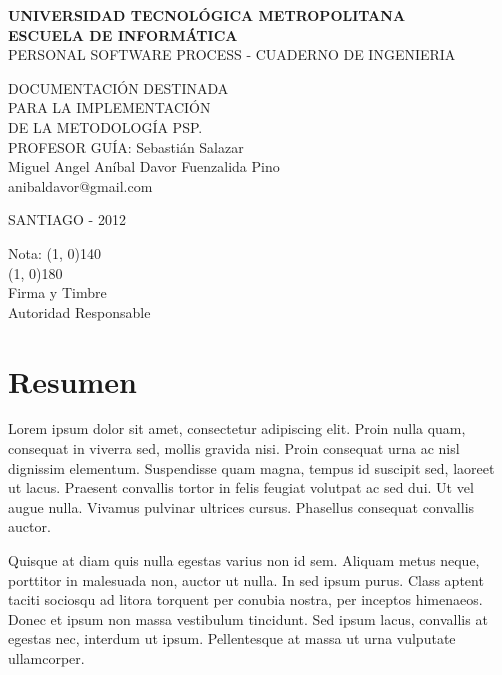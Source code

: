 \documentclass[a4paper,12pt,openany,oneside]{book}
\begin{document}
\thispagestyle{empty}
\begin{center}
\textbf{UNIVERSIDAD TECNOLÓGICA METROPOLITANA\\
ESCUELA DE INFORMÁTICA}\\
\vspace{3cm}
PERSONAL SOFTWARE PROCESS - CUADERNO DE INGENIERIA
\end{center}
\begin{flushright}
DOCUMENTACIÓN DESTINADA\\
PARA LA IMPLEMENTACIÓN\\
DE LA METODOLOGÍA PSP.\\
\vspace{3cm}
PROFESOR GUÍA: Sebastián Salazar\\
\vspace{1.5cm}
Miguel Angel Aníbal Davor Fuenzalida Pino\\
anibaldavor@gmail.com
\end{flushright}
\vspace{4cm}
\begin{center}
SANTIAGO - 2012
\end{center}
\newpage
\thispagestyle{empty}
\begin{flushright}
\vspace{20mm}
Nota: \line(1, 0){140} \\
\vspace{30 mm}
\line(1, 0){180}\\	
Firma y Timbre\\
Autoridad Responsable
\end{flushright}
\chapter*{Resumen}
\thispagestyle{empty}
Lorem ipsum dolor sit amet, consectetur adipiscing elit. Proin nulla quam, consequat in viverra sed, mollis gravida nisi. Proin consequat urna ac nisl dignissim elementum. Suspendisse quam magna, tempus id suscipit sed, laoreet ut lacus. Praesent convallis tortor in felis feugiat volutpat ac sed dui. Ut vel augue nulla. Vivamus pulvinar ultrices cursus. Phasellus consequat convallis auctor.

Quisque at diam quis nulla egestas varius non id sem. Aliquam metus neque, porttitor in malesuada non, auctor ut nulla. In sed ipsum purus. Class aptent taciti sociosqu ad litora torquent per conubia nostra, per inceptos himenaeos. Donec et ipsum non massa vestibulum tincidunt. Sed ipsum lacus, convallis at egestas nec, interdum ut ipsum. Pellentesque at massa ut urna vulputate ullamcorper.
\tableofcontents
\end{document}
